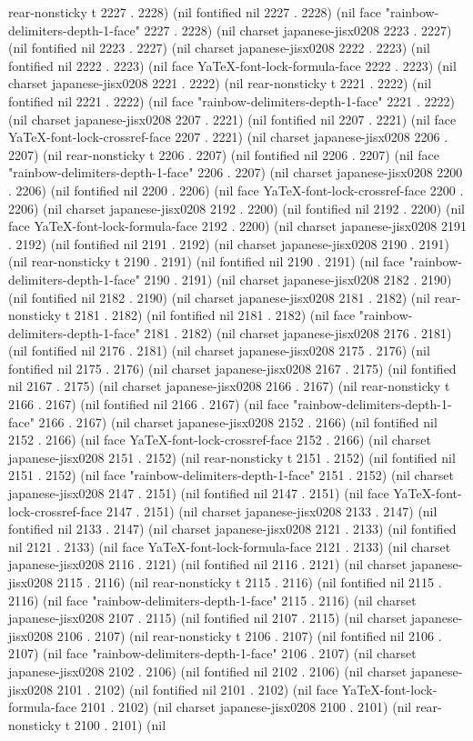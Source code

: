 rear-nonsticky t 2227 . 2228) (nil fontified nil 2227 . 2228) (nil face "rainbow-delimiters-depth-1-face" 2227 . 2228) (nil charset japanese-jisx0208 2223 . 2227) (nil fontified nil 2223 . 2227) (nil charset japanese-jisx0208 2222 . 2223) (nil fontified nil 2222 . 2223) (nil face YaTeX-font-lock-formula-face 2222 . 2223) (nil charset japanese-jisx0208 2221 . 2222) (nil rear-nonsticky t 2221 . 2222) (nil fontified nil 2221 . 2222) (nil face "rainbow-delimiters-depth-1-face" 2221 . 2222) (nil charset japanese-jisx0208 2207 . 2221) (nil fontified nil 2207 . 2221) (nil face YaTeX-font-lock-crossref-face 2207 . 2221) (nil charset japanese-jisx0208 2206 . 2207) (nil rear-nonsticky t 2206 . 2207) (nil fontified nil 2206 . 2207) (nil face "rainbow-delimiters-depth-1-face" 2206 . 2207) (nil charset japanese-jisx0208 2200 . 2206) (nil fontified nil 2200 . 2206) (nil face YaTeX-font-lock-crossref-face 2200 . 2206) (nil charset japanese-jisx0208 2192 . 2200) (nil fontified nil 2192 . 2200) (nil face YaTeX-font-lock-formula-face 2192 . 2200) (nil charset japanese-jisx0208 2191 . 2192) (nil fontified nil 2191 . 2192) (nil charset japanese-jisx0208 2190 . 2191) (nil rear-nonsticky t 2190 . 2191) (nil fontified nil 2190 . 2191) (nil face "rainbow-delimiters-depth-1-face" 2190 . 2191) (nil charset japanese-jisx0208 2182 . 2190) (nil fontified nil 2182 . 2190) (nil charset japanese-jisx0208 2181 . 2182) (nil rear-nonsticky t 2181 . 2182) (nil fontified nil 2181 . 2182) (nil face "rainbow-delimiters-depth-1-face" 2181 . 2182) (nil charset japanese-jisx0208 2176 . 2181) (nil fontified nil 2176 . 2181) (nil charset japanese-jisx0208 2175 . 2176) (nil fontified nil 2175 . 2176) (nil charset japanese-jisx0208 2167 . 2175) (nil fontified nil 2167 . 2175) (nil charset japanese-jisx0208 2166 . 2167) (nil rear-nonsticky t 2166 . 2167) (nil fontified nil 2166 . 2167) (nil face "rainbow-delimiters-depth-1-face" 2166 . 2167) (nil charset japanese-jisx0208 2152 . 2166) (nil fontified nil 2152 . 2166) (nil face YaTeX-font-lock-crossref-face 2152 . 2166) (nil charset japanese-jisx0208 2151 . 2152) (nil rear-nonsticky t 2151 . 2152) (nil fontified nil 2151 . 2152) (nil face "rainbow-delimiters-depth-1-face" 2151 . 2152) (nil charset japanese-jisx0208 2147 . 2151) (nil fontified nil 2147 . 2151) (nil face YaTeX-font-lock-crossref-face 2147 . 2151) (nil charset japanese-jisx0208 2133 . 2147) (nil fontified nil 2133 . 2147) (nil charset japanese-jisx0208 2121 . 2133) (nil fontified nil 2121 . 2133) (nil face YaTeX-font-lock-formula-face 2121 . 2133) (nil charset japanese-jisx0208 2116 . 2121) (nil fontified nil 2116 . 2121) (nil charset japanese-jisx0208 2115 . 2116) (nil rear-nonsticky t 2115 . 2116) (nil fontified nil 2115 . 2116) (nil face "rainbow-delimiters-depth-1-face" 2115 . 2116) (nil charset japanese-jisx0208 2107 . 2115) (nil fontified nil 2107 . 2115) (nil charset japanese-jisx0208 2106 . 2107) (nil rear-nonsticky t 2106 . 2107) (nil fontified nil 2106 . 2107) (nil face "rainbow-delimiters-depth-1-face" 2106 . 2107) (nil charset japanese-jisx0208 2102 . 2106) (nil fontified nil 2102 . 2106) (nil charset japanese-jisx0208 2101 . 2102) (nil fontified nil 2101 . 2102) (nil face YaTeX-font-lock-formula-face 2101 . 2102) (nil charset japanese-jisx0208 2100 . 2101) (nil rear-nonsticky t 2100 . 2101) (nil 